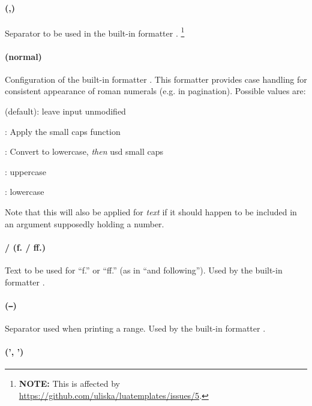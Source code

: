 \documentclass{scrartcl}
\begin{document}
\paragraph{ (,)}

Separator to be used in the built-in formatter .%
\footnote{\textbf{NOTE:} This is affected by
\url{https://github.com/uliska/luatemplates/issues/5}.}


\paragraph{ (normal)}

Configuration of the built-in formatter .  This formatter
provides case handling for consistent appearance of roman numerals (e.g. in
pagination).  Possible values are:

\begin{itemize*}
\item {} (default): leave input unmodified
\item {}: Apply the small caps function
\item {}: Convert to lowercase, \emph{then} usd small caps
\item {}: uppercase
\item {}: lowercase
\end{itemize*}

\noindent Note that this will also be applied for \emph{text} if it should
happen to be included in an argument supposedly holding a number.

\paragraph{ /  (f. / ff.)}

Text to be used for “f.” or “ff.” (as in “and following”).  Used by the built-in formatter .


\paragraph{ (\texttt{--})}

Separator used when printing a range.  Used by the built-in formatter .


\paragraph{ (', ')}
\end{document}

